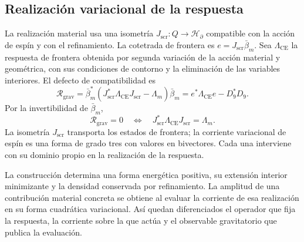 \subsection{Realización variacional de la respuesta}
\label{vii:sec:realizacion-respuesta}

La realización material usa una isometría
\(J_{\mathrm{scr}}:Q\longrightarrow\mathcal H_\partial\)
compatible con la acción de espín y con el refinamiento.
La cotetrada de frontera es \(e=J_{\mathrm{scr}}\bar\beta_m\).
Sea \(\Lambda_{\mathrm{CE}}\) la respuesta de frontera obtenida
por segunda variación de la acción material y geométrica, con sus
condiciones de contorno y la eliminación de las variables interiores.
El defecto de compatibilidad es
\begin{equation}
 \mathcal R_{\mathrm{grav}}
 =\bar\beta_m^*
   (J_{\mathrm{scr}}^*\Lambda_{\mathrm{CE}}J_{\mathrm{scr}}-\Lambda_m)
   \bar\beta_m
 =e^*\Lambda_{\mathrm{CE}}e-D_9^*D_9.
 \label{vii:eq:defecto-respuesta}
\end{equation}
Por la invertibilidad de \(\bar\beta_m\),
\[
 \mathcal R_{\mathrm{grav}}=0
 \quad\Longleftrightarrow\quad
 J_{\mathrm{scr}}^*\Lambda_{\mathrm{CE}}J_{\mathrm{scr}}=\Lambda_m.
\]
La isometría \(J_{\mathrm{scr}}\) transporta los estados de frontera;
la corriente variacional de espín es una forma de grado tres con valores
en bivectores. Cada una interviene con su dominio propio en la
realización de la respuesta.

La construcción determina una forma energética positiva, su extensión
interior minimizante y la densidad conservada por refinamiento.
La amplitud de una contribución material concreta se obtiene al evaluar
la corriente de esa realización en su forma cuadrática variacional.
Así quedan diferenciados el operador que fija la respuesta, la corriente
sobre la que actúa y el observable gravitatorio que publica la evaluación.
